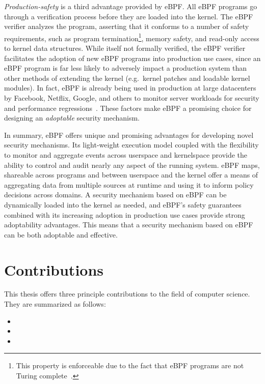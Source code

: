 \textit{Production-safety} is a third advantage provided by eBPF. All eBPF programs go
through a verification process before they are loaded into the kernel. The eBPF verifier
analyzes the program, asserting that it conforms to a number of safety requirements, such
as program termination\footnote{This property is enforceable due to the fact that eBPF
programs are not Turing complete~\cite{gregg2019_bpf}.}, memory safety, and read-only
access to kernel data structures. While itself not formally verified, the eBPF verifier
facilitates the adoption of new eBPF programs into production use cases, since an eBPF
program is far less likely to adversely impact a production system than other methods of
extending the kernel (e.g.~kernel patches and loadable kernel modules). In fact, eBPF is
already being used in production at large datacenters by Facebook, Netflix, Google, and
others to monitor server workloads for security and performance
regressions~\cite{gregg2019_bpf}. These factors make eBPF a promising choice for
designing an \textit{adoptable} security mechanism.

In summary, eBPF offers unique and promising advantages for developing novel security
mechanisms. Its light-weight execution model coupled with the flexibility to monitor and
aggregate events across userspace and kernelspace provide the ability to control and audit
nearly any aspect of the running system. eBPF maps, shareable across programs and between
userspace and the kernel offer a means of aggregating data from multiple sources at
runtime and using it to inform policy decisions across domains. A security mechanism based
on eBPF can be dynamically loaded into the kernel as needed, and eBPF's safety guarantees
combined with its increasing adoption in production use cases provide strong adoptability
advantages. This means that a security mechanism based on eBPF can be both adoptable and
effective.


\section{Contributions}%
\label{s:contributions}

This thesis offers three principle contributions to the field of computer science.
They are summarized as follows:
\begin{itemize}
  \item {}
  \item {}
  \item {}
\end{itemize}

